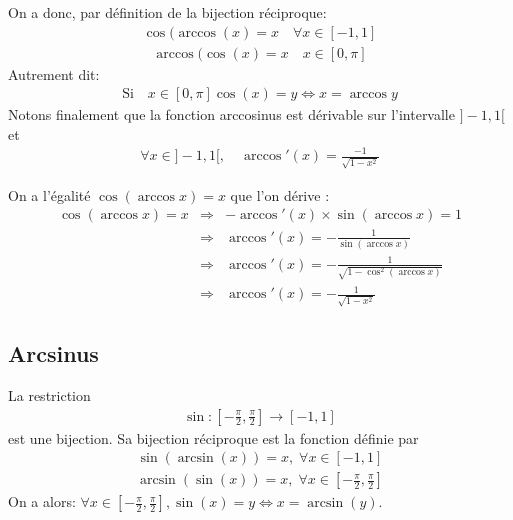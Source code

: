 \documentclass[letterpaper,10pt,french]{jupyterBook}
\begin{document}
\sphinxAtStartPar
On a donc, par définition de la bijection réciproque:
\begin{equation*}
\begin{split}
\cos(\arccos(x)=x \quad\forall x \in [−1,1]
\end{split}
\end{equation*}\begin{equation*}
\begin{split}
\arccos(\cos(x)=x \quad x \in [0,\pi]
\end{split}
\end{equation*}
\sphinxAtStartPar
Autrement dit:
\begin{equation*}
\begin{split}
\mbox{Si}\quad x \in[0,\pi] \cos(x) =y \Leftrightarrow x = \arccos y
\end{split}
\end{equation*}
\sphinxAtStartPar
Notons finalement que la fonction arccosinus est dérivable sur l’intervalle \(]-1,1[\) et
\begin{equation*}
\begin{split}
\forall x\in ]-1,1[,\quad \arccos'(x)=\frac{-1}{\sqrt{1-x^2}}
\end{split}
\end{equation*}
\sphinxAtStartPar
{}

\sphinxAtStartPar
On a l’égalité \(\cos(\arccos x) = x\) que l’on dérive :
\begin{eqnarray*}
\cos(\arccos x)=x
&\Rightarrow& −\arccos'(x)\times\sin(\arccos x) = 1\\
&\Rightarrow&  \arccos'(x)=-\frac{1}{\sin(\arccos x)}\\
&\Rightarrow& \arccos'(x)=-\frac{1}{\sqrt{1-\cos^2(\arccos x)}}\\
&\Rightarrow& \arccos'(x)=-\frac{1}{\sqrt{1-x^2}}
\end{eqnarray*}

\subsection{Arcsinus}
\label{\detokenize{fcthycerinvs:arcsinus}}
\sphinxAtStartPar
La restriction
\begin{equation*}
\begin{split}
\sin:[-\frac{\pi}{2},\frac{\pi}{2}]\rightarrow [-1,1]
\end{split}
\end{equation*}
\sphinxAtStartPar
est une bijection. Sa bijection réciproque est la fonction  définie par
\begin{equation*}
\begin{split}
\sin(\arcsin(x))=x,\;\forall x\in [-1,1]
\end{split}
\end{equation*}\begin{equation*}
\begin{split}
\arcsin(\sin(x))=x,\;\forall x\in[-\frac{\pi}{2},\frac{\pi}{2}] 
\end{split}
\end{equation*}
\sphinxAtStartPar
On a alors: \(\forall x\in[-\frac{\pi}{2},\frac{\pi}{2}] , \sin (x)=y\Leftrightarrow x=\arcsin(y).\)
\end{document}
